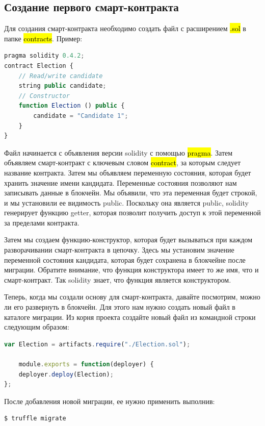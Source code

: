 \documentclass{article}
\begin{document}
\subsection{Создание первого смарт-контракта}
\medskip
Для создания смарт-контракта необходимо создать файл с расширением \hl{.sol} в папке \hl{contracts}. 
Пример:


\begin{lstlisting}[language=JavaScript, caption={contracts/Election.sol}]
pragma solidity 0.4.2;
contract Election {
	// Read/write candidate
	string public candidate;
	// Constructor
	function Election () public {
		candidate = "Candidate 1";
	}
}
\end{lstlisting}


Файл начинается с объявления версии solidity с помощью \hl{pragma}. Затем объявляем смарт-контракт с ключевым словом \hl{contract}, за которым следует название контракта. Затем мы объявляем переменную состояния, которая будет хранить значение имени кандидата. Переменные состояния позволяют нам записывать данные в блокчейн. Мы объявили, что эта переменная будет строкой, и мы установили ее видимость public. Поскольку она является public, solidity генерирует функцию getter, которая позволит получить доступ к этой переменной за пределами контракта.

Затем мы создаем функцию-конструктор, которая будет вызываться при каждом разворачивании смарт-контракта в цепочку. Здесь мы установим значение переменной состояния кандидата, которая будет сохранена в блокчейне после миграции. Обратите внимание, что функция конструктора имеет то же имя, что и смарт-контракт. Так solidity знает, что функция является конструктором.

\bigbreak

Теперь, когда мы создали основу для смарт-контракта, давайте посмотрим, можно ли его развернуть в блокчейн. Для этого нам нужно создать новый файл в каталоге миграции. Из корня проекта создайте новый файл из командной строки следующим образом:

\begin{lstlisting}[language=JavaScript, caption={contracts/Election.sol}]
var Election = artifacts.require("./Election.sol");

	module.exports = function(deployer) {
	deployer.deploy(Election);
};
\end{lstlisting}


После добавления новой миграции, ее нужно применить выполнив:

\begin{lstlisting}
$ truffle migrate
\end{lstlisting}
\end{document}
